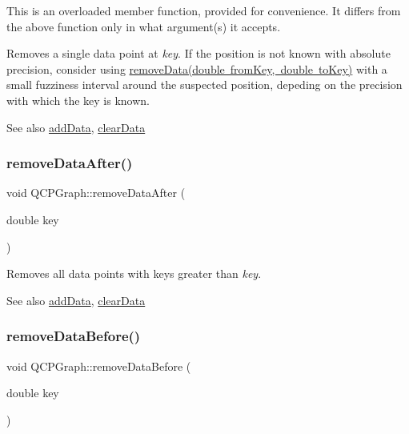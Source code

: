 This is an overloaded member function, provided for convenience. It differs from the above function only in what argument(s) it accepts.

Removes a single data point at {\itshape key}. If the position is not known with absolute precision, consider using \mbox{\hyperlink{class_q_c_p_graph_a4a0fde50b7db9db0a85b5c5b6b10098f}{remove\+Data(double from\+Key, double to\+Key)}} with a small fuzziness interval around the suspected position, depeding on the precision with which the key is known.

\begin{DoxySeeAlso}{See also}
\mbox{\hyperlink{class_q_c_p_graph_aa5c6181d84db72ce4dbe9dc15a34ef4f}{add\+Data}}, \mbox{\hyperlink{class_q_c_p_graph_ad4e94a4e44e5e76fbec81a72a977157d}{clear\+Data}} 
\end{DoxySeeAlso}
\mbox{\label{class_q_c_p_graph_ae42d645ef617cfc75fc0df58e62c522a}} 
\subsubsection{\texorpdfstring{remove\+Data\+After()}{removeDataAfter()}}
{\footnotesize\ttfamily void Q\+C\+P\+Graph\+::remove\+Data\+After (\begin{DoxyParamCaption}\item[{double}]{key }\end{DoxyParamCaption})}

Removes all data points with keys greater than {\itshape key}. \begin{DoxySeeAlso}{See also}
\mbox{\hyperlink{class_q_c_p_graph_aa5c6181d84db72ce4dbe9dc15a34ef4f}{add\+Data}}, \mbox{\hyperlink{class_q_c_p_graph_ad4e94a4e44e5e76fbec81a72a977157d}{clear\+Data}} 
\end{DoxySeeAlso}
\mbox{\label{class_q_c_p_graph_a9fe0b3e54e8c7b61319bd03337e21e99}} 
\subsubsection{\texorpdfstring{remove\+Data\+Before()}{removeDataBefore()}}
{\footnotesize\ttfamily void Q\+C\+P\+Graph\+::remove\+Data\+Before (\begin{DoxyParamCaption}\item[{double}]{key }\end{DoxyParamCaption})}

